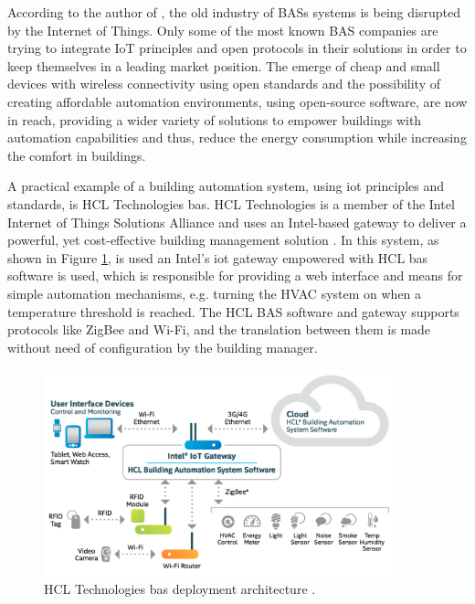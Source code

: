 According to the author of \cite{TransformativeWave}, the old industry of BASs systems is being disrupted by the Internet of Things. Only some of the most known BAS companies are trying to integrate IoT principles and open protocols in their solutions in order to keep themselves in a leading market position. The emerge of cheap and small devices with wireless connectivity using open standards and the possibility of creating affordable automation environments, using open-source software, are now in reach, providing a wider variety of solutions to empower buildings with automation capabilities and thus, reduce the energy consumption while increasing the comfort in buildings.

A practical example of a building automation system, using \ac{iot} principles and standards, is HCL Technologies \ac{bas}. HCL Technologies is a member of the Intel Internet of Things Solutions Alliance \cite{intel} and uses an Intel-based gateway to deliver a powerful, yet cost-effective building management solution \cite{hcl}. In this system, as shown in Figure \ref{fig:intel}, is used an Intel's \ac{iot} gateway empowered with HCL \ac{bas} software is used, which is responsible for providing a web interface and means for simple automation mechanisms, e.g. turning the HVAC system on when a temperature threshold is reached. The HCL BAS software and gateway supports protocols like ZigBee and Wi-Fi, and the translation between them is made without need of configuration by the building manager.



\begin{figure}[H]
	\centering
	\includegraphics[width=0.9\textwidth]{figures/intelhclarch.png}
	\caption{HCL Technologies \ac{bas} deployment architecture \cite{hcl}.}
	\label{fig:intel}
\end{figure}


